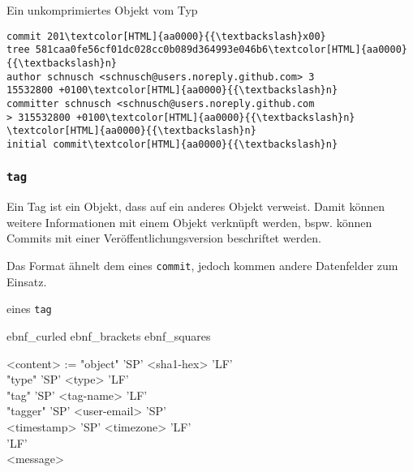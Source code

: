 \documentclass[
	nonacm,%
	screen,%
	sigplan,
]{acmart}
\newenvironment{myebnf}[1][4em]{%
	\begin{minipage}{.9\linewidth}%
		\expandafter \undef \csname ebnf_curled\endcsname
		\expandafter \undef \csname ebnf_brackets\endcsname
		\expandafter \undef \csname ebnf_squares\endcsname
		\begin{ebnf}[#1]%
}{%
		\end{ebnf}%
	\end{minipage}%
}
\begin{document}
\begin{example}
	\caption{Ein unkomprimiertes Objekt vom Typ }%
	\label{commit-example}%
	\centering
	\begin{Verbatim}[commandchars=\\\{\},fontsize=\small]
commit 201\textcolor[HTML]{aa0000}{{\textbackslash}x00}
tree 581caa0fe56cf01dc028cc0b089d364993e046b6\textcolor[HTML]{aa0000}{{\textbackslash}n}
author schnusch <schnusch@users.noreply.github.com> 3
15532800 +0100\textcolor[HTML]{aa0000}{{\textbackslash}n}
committer schnusch <schnusch@users.noreply.github.com
> 315532800 +0100\textcolor[HTML]{aa0000}{{\textbackslash}n}
\textcolor[HTML]{aa0000}{{\textbackslash}n}
initial commit\textcolor[HTML]{aa0000}{{\textbackslash}n}
	\end{Verbatim}
\end{example}

\subsubsection{\texttt{tag}}\label{tag}

Ein Tag ist ein Objekt, dass auf ein anderes Objekt verweist. Damit können weitere Informationen mit einem Objekt verknüpft werden, bspw. können Commits mit einer Veröffentlichungsversion beschriftet werden.

Das Format ähnelt dem eines \texttt{commit}, jedoch kommen andere Datenfelder zum Einsatz.

\begin{format}
	\caption{ eines \texttt{tag}}%
	\label{tag-syntax}%
	\begin{myebnf}[6.5em]
		<content> := "object" 'SP' <sha1-hex> 'LF' \\
		\null\hspace{6.5em} "type" 'SP' <type> 'LF' \\
		\null\hspace{6.5em} "tag" 'SP' <tag-name> 'LF' \\
		\null\hspace{6.5em} "tagger" 'SP' <user-email> 'SP' \\
		\null\hspace{6.5em} <timestamp> 'SP' <timezone> 'LF' \\
		\null\hspace{6.5em} 'LF' \\
		\null\hspace{6.5em} <message>
	\end{myebnf}
\end{format}
\end{document}
